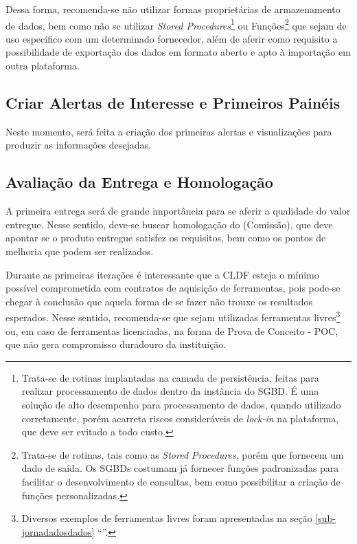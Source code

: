 
Dessa forma, recomenda-se não utilizar formas proprietárias de armazenamento de dados, bem como não se utilizar \emph{Stored Procedures}\footnote{Trata-se de rotinas implantadas na camada de persistência, feitas para realizar processamento de dados dentro da instância do SGBD. É uma solução de alto desempenho para processamento de dados, quando utilizado corretamente, porém acarreta riscos consideráveis de \emph{lock-in} na plataforma, que deve ser evitado a todo custo.} ou Funções\footnote{Trata-se de rotinas, tais como as \emph{Stored Procedures}, porém que fornecem um dado de saída. Os SGBDs costumam já fornecer funções padronizadas para facilitar o desenvolvimento de consultas, bem como possibilitar a criação de funções personalizadas.} que sejam de uso específico com um determinado fornecedor, além de aferir como requisito a possibilidade de exportação dos dados em formato aberto e apto à importação em outra plataforma.


\subsection{Criar Alertas de Interesse e Primeiros Painéis}

Neste momento, será feita a criação dos primeiras alertas e visualizações para produzir as informações desejadas.

\subsection{Avaliação da Entrega e Homologação}

A primeira entrega será de grande importância para se aferir a qualidade do valor entregue. Nesse sentido, deve-se buscar homologação do \CLIENTE \xspace (Comissão), que deve apontar se o produto entregue satisfez os requisitos, bem como os pontos de melhoria que podem ser realizados.

Durante as primeiras iterações é interessante que a CLDF esteja o mínimo possível comprometida com contratos de aquisição de ferramentas, pois pode-se chegar à conclusão que aquela forma de se fazer não trouxe os resultados esperados. Nesse sentido, recomenda-se que sejam utilizadas ferramentas livres\footnote{Diversos exemplos de ferramentas livres foram apresentadas na seção \ref{sub-jornadadosdados} ``''.} ou, em caso de ferramentas licenciadas, na forma de Prova de Conceito - POC, que não gera compromisso duradouro da instituição.